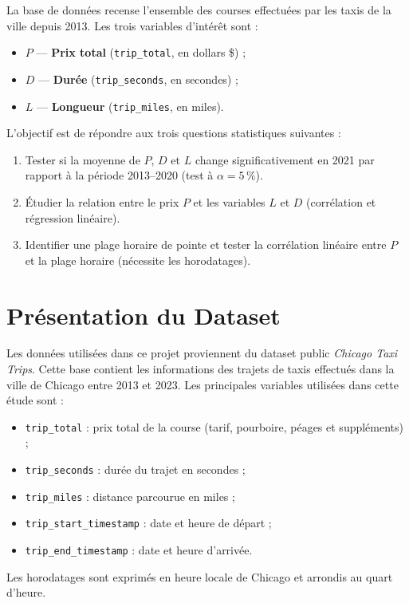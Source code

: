 \documentclass[11pt,a4paper]{article}
\begin{document}
La base de données recense l'ensemble des courses effectuées par les taxis de la ville depuis 2013.
Les trois variables d'intérêt sont :
\begin{itemize}
  \item $P$ --- \textbf{Prix total} (\texttt{trip\_total}, en dollars \$) ;
  \item $D$ --- \textbf{Durée} (\texttt{trip\_seconds}, en secondes) ;
  \item $L$ --- \textbf{Longueur} (\texttt{trip\_miles}, en miles).
\end{itemize}

L'objectif est de répondre aux trois questions statistiques suivantes :
\begin{enumerate}
  \item Tester si la moyenne de $P$, $D$ et $L$ change significativement en 2021 par rapport à la période
        2013--2020 (test à $\alpha = 5\,\%$).
  \item Étudier la relation entre le prix $P$ et les variables $L$ et $D$ (corrélation et régression linéaire).
  \item Identifier une plage horaire de pointe et tester la corrélation linéaire entre $P$ et la plage horaire
        (nécessite les horodatages).
\end{enumerate}

\section{Présentation du Dataset}

Les données utilisées dans ce projet proviennent du dataset public \textit{Chicago Taxi Trips}.
Cette base contient les informations des trajets de taxis effectués dans la ville de Chicago entre 2013 et 2023.
Les principales variables utilisées dans cette étude sont :
\begin{itemize}
  \item \texttt{trip\_total} : prix total de la course (tarif, pourboire, péages et suppléments) ;
  \item \texttt{trip\_seconds} : durée du trajet en secondes ;
  \item \texttt{trip\_miles} : distance parcourue en miles ;
  \item \texttt{trip\_start\_timestamp} : date et heure de départ ;
  \item \texttt{trip\_end\_timestamp} : date et heure d'arrivée.
\end{itemize}
Les horodatages sont exprimés en heure locale de Chicago et arrondis au quart d'heure.
\end{document}
